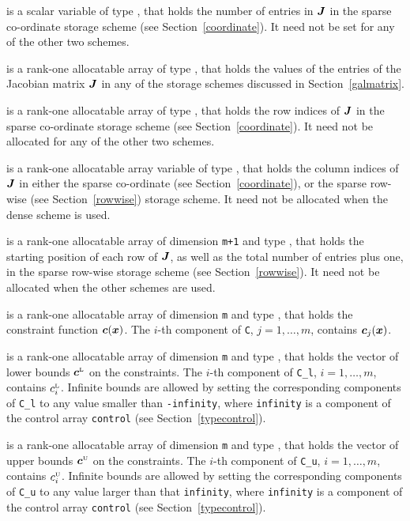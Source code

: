 \documentclass{galahad}
\newcommand{\sL}{\s{L}}
\newcommand{\sU}{\s{U}}
\begin{document}
\begin{description}
\begin{description}
 is a scalar variable of type \integer, that
holds the number of entries in ${\bm{J}}$
in the sparse co-ordinate storage scheme (see Section~\ref{coordinate}).
It need not be set for any of the other two schemes.

 is a rank-one allocatable array of type \realdp, that holds
the values of the entries of the Jacobian matrix ${\bm{J}}$ in any of the
storage schemes discussed in Section~\ref{galmatrix}.

 is a rank-one allocatable array of type \integer,
that holds the row indices of ${\bm{J}}$ in the sparse co-ordinate storage
scheme (see Section~\ref{coordinate}).
It need not be allocated for any of the other two schemes.

 is a rank-one allocatable array variable of type \integer,
that holds the column indices of ${\bm{J}}$ in either the sparse co-ordinate
(see Section~\ref{coordinate}), or the sparse row-wise
(see Section~\ref{rowwise}) storage scheme.
It need not be allocated when the dense scheme is used.

 is a rank-one allocatable array of dimension {\tt m+1} and type
\integer, that holds the starting position of
each row of ${\bm{J}}$, as well
as the total number of entries plus one, in the sparse row-wise storage
scheme (see Section~\ref{rowwise}). It need not be allocated when the
other schemes are used.

\end{description}

 is a rank-one allocatable array of dimension {\tt m} and type
\realdp, that holds the constraint function  ${\bm{c}}({\bm{x}})$.
The $i$-th component of
{\tt C}, $j = 1,  \ldots ,  m$, contains ${\bm{c}}_{j}({\bm{x}})$.

 is a rank-one allocatable array of dimension {\tt m} and type
\realdp, that holds
the vector of lower bounds $\bmc\sL$ on the constraints.
The $i$-th component of {\tt C\_l}, $i = 1, \ldots , m$, contains $c_{i}\sL$.
Infinite bounds are allowed by setting the corresponding
components of {\tt C\_l} to any value smaller than {\tt -infinity},
where {\tt infinity} is a component of the control array {\tt control}
(see Section~\ref{typecontrol}).

 is a rank-one allocatable array of dimension {\tt m} and type
\realdp, that holds
the vector of upper bounds $\bmc\sU$ on the constraints.
The $i$-th component of {\tt C\_u}, $i = 1, \ldots , m$, contains $c_{i}\sU$.
Infinite bounds are allowed by setting the corresponding
components of {\tt C\_u} to any value larger than that {\tt infinity},
where {\tt infinity} is a component of the control array {\tt control}
(see Section~\ref{typecontrol}).


\end{description}
\end{document}
